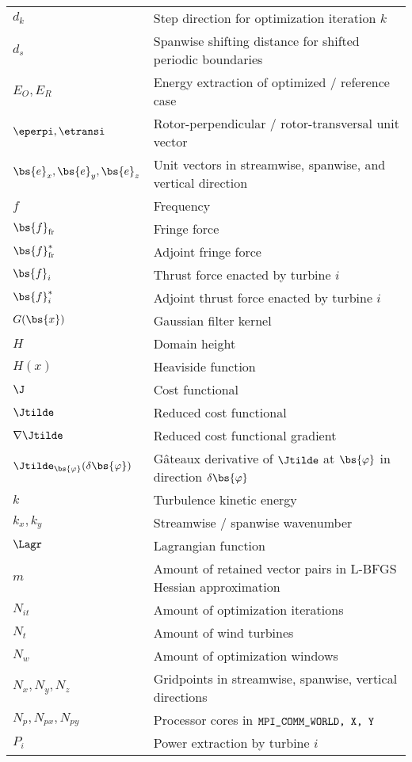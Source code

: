 \begin{tabular}{ p{2cm}  l }
	$d_k$ 		& Step direction for optimization iteration $k$\\
	$d_s$ 	    & Spanwise shifting distance for shifted periodic boundaries\\
	$E_O, E_R$ & Energy extraction of optimized / reference case\\
	$\eperpi, \etransi$ & Rotor-perpendicular / rotor-transversal unit vector\\
	$\bs{e}_x, \bs{e}_y, \bs{e}_z$ & Unit vectors in streamwise, spanwise, and vertical direction\\
	$f$	        & Frequency\\
	$\bs{f}_{\rm fr}$  & Fringe force\\
	$\bs{f}_{\rm fr}^*$  & Adjoint fringe force\\
	$\bs{f}_i$  & Thrust force enacted by turbine $i$\\
	$\bs{f}_i^*$& Adjoint thrust force enacted by turbine $i$\\
	$G(\bs{x})$  & Gaussian filter kernel\\
	$H$			& Domain height\\
	$H(x)$ 	 	& Heaviside function\\
	$\J$        & Cost functional\\
	$\Jtilde$   & Reduced cost functional\\
	$\nabla \Jtilde$ & Reduced cost functional gradient\\
	$\Jtilde_{\bs{\varphi}}(\delta \bs{\varphi})$ & G\^ateaux derivative of $\Jtilde$ at $\bs{\varphi}$ in direction $\delta \bs{\varphi}$\\
	$k$  		& Turbulence kinetic energy\\
	$k_x, k_y$	& Streamwise / spanwise wavenumber\\
	$\Lagr$     & Lagrangian function\\
	$m$			& Amount of retained vector pairs in L-BFGS Hessian approximation\\
	$N_{it}$    & Amount of optimization iterations\\
	$N_t$ 		& Amount of wind turbines\\
	$N_w$		& Amount of optimization windows\\
	$N_x, N_y, N_z$ & Gridpoints in streamwise, spanwise, vertical directions\\
	$N_p, N_{px}, N_{py}$ & Processor cores in $\verb|MPI_COMM_WORLD, X, Y|$\\
	$P_i$ 	    & Power extraction by turbine $i$\\

\end{tabular}
